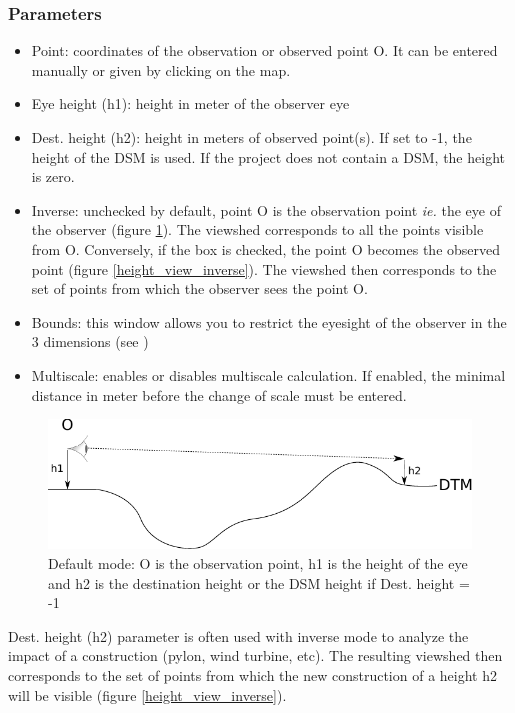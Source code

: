 \documentclass{report}
\begin{document}
\subsubsection{Parameters}
\label{viewshed_param}
\begin{itemize}
	\item Point: coordinates of the observation or observed point O. It can be entered manually or given by clicking on the map.
	\item Eye height (h1): height in meter of the observer eye
	\item Dest. height (h2): height in meters of observed point(s). If set to -1, the height of the DSM is used. If the project does not contain a DSM, the height is zero.
	\item Inverse: unchecked by default, point O is the observation point \textit{ie.} the eye of the observer (figure \ref{height_view}). The viewshed corresponds to all the points visible from O. Conversely, if the box is checked, the point O becomes the observed point (figure \ref{height_view_inverse}). The viewshed then corresponds to the set of points from which the observer sees the point O.
	\item Bounds: this window allows you to restrict the eyesight of the observer in the 3 dimensions (see )
	\item Multiscale: enables or disables multiscale calculation. If enabled, the minimal distance in meter before the change of scale must be entered.
\end{itemize}


\begin{figure}[H]
	\includegraphics{img/height_view-en.pdf} 
	\caption{Default mode: O is the observation point, h1 is the height of the eye and h2 is the destination height or the DSM height if Dest. height = -1}
	\label{height_view}
\end{figure}

Dest. height (h2) parameter is often used with inverse mode to analyze the impact of a construction (pylon, wind turbine, etc). The resulting viewshed then corresponds to the set of points from which the new construction of a height h2 will be visible (figure \ref{height_view_inverse}).
\end{document}
